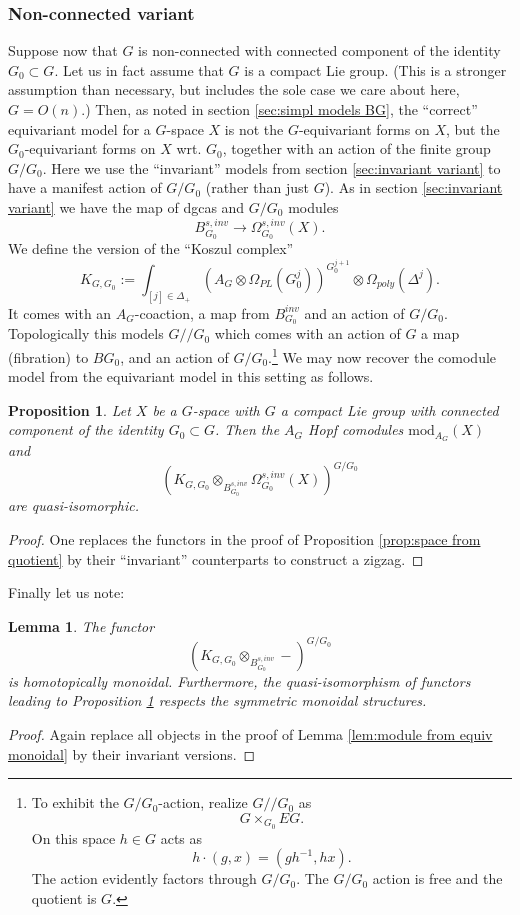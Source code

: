 \documentclass[a4paper]{amsart}
\theoremstyle{plain}
\newtheorem{prop}[thm]{Proposition}
\newtheorem{lemma}[thm]{Lemma}
\theoremstyle{definition}
\newcommand{\dgca}{\mathsf{Dgca}}
\renewcommand{\mod}{\mathrm{mod}}
\begin{document}
\subsubsection{Non-connected variant}
Suppose now that $G$ is non-connected with connected component of the identity $G_0\subset G$.
Let us in fact assume that $G$ is a compact Lie group. (This is a stronger assumption than necessary, but includes the sole case we care about here, $G=O(n)$.)
Then, as noted in section \ref{sec:simpl models BG}, the ``correct'' equivariant model for a $G$-space $X$ is not the $G$-equivariant forms on $X$, but the $G_0$-equivariant forms on $X$ wrt. $G_0$, together with an action of the finite group $G/G_0$.
Here we use the ``invariant'' models from section \ref{sec:invariant variant} to have a manifest action of $G/G_0$ (rather than just $G$).
As in section \ref{sec:invariant variant} we have the map of dgcas and $G/G_0$ modules
\[
 B_{G_0}^{s,inv} \to \Omega_{G_0}^{s,inv}(X).
\]
We define the version of the ``Koszul complex''
\[
K_{G,G_0}:=  \int_{[j]\in \Delta_+} \left(A_G \otimes \Omega_{PL}(G_0^j)\right)^{G_0^{j+1}} \otimes \Omega_{poly}(\Delta^j).
\]
It comes with an $A_G$-coaction, a map from $B_{G_0}^{inv}$ and an action of $G/G_0$.
Topologically this models $G//G_0$ which comes with an action of $G$ a map (fibration) to $BG_0$, and an action of $G/G_0$.\footnote{To exhibit the $G/G_0$-action, realize $G//G_0$ as  
\[
 G \times_{G_0} EG.
\]
On this space $h\in G$ acts as
\[
 h\cdot (g,x) = (gh^{-1},hx).
\]
The action evidently factors through $G/G_0$. The $G/G_0$ action is free and the quotient is $G$.
}
We may now recover the comodule model from the equivariant model in this setting as follows.
\begin{prop}\label{prop:space from quotient inv}
 Let $X$ be a $G$-space with $G$ a compact Lie group with connected component of the identity $G_0\subset G$.
 Then the $A_G$ Hopf comodules $\mod_{A_G}(X)$ and 
 \[
  \left( K_{G,G_0} \otimes_{B_{G_0}^{s,inv}}  \Omega_{G_0}^{s,inv}(X) \right)^{G/G_0}
 \]
are quasi-isomorphic.
\end{prop}
\begin{proof}
 One replaces the functors in the proof of Proposition \ref{prop:space from quotient} by their ``invariant'' counterparts to 
 construct a zigzag.
\end{proof}

Finally let us note:
\begin{lemma}\label{lem:module from equiv monoidal inv}
The functor 
\[
(K_{G,G_0} \otimes_{B_{G_0}^{s,inv}} -)^{G/G_0} %
\]
is homotopically monoidal. Furthermore, the quasi-isomorphism of functors leading to Proposition \ref{prop:space from quotient inv} respects the symmetric monoidal structures.
\end{lemma}
\begin{proof}
 Again replace all objects in the proof of Lemma \ref{lem:module from equiv monoidal} by their invariant versions.
\end{proof}
\end{document}

